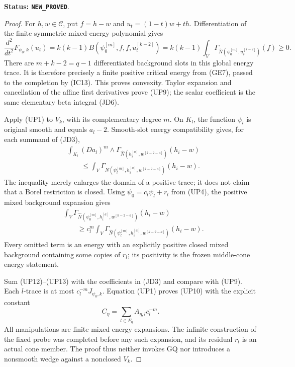 \noindent\textbf{Status: \texttt{NEW\_PROVED}}.

\begin{proof}
For $h,w\in\mathcal C$, put $f=h-w$ and $u_t=(1-t)w+th$.
Differentiation of the finite symmetric mixed-energy polynomial
gives
\[
 \frac{d^2}{dt^2}F_{\psi_0,k}(u_t)
  =k(k-1)B(\psi_0^{[m]},f,f,u_t^{[k-2]})
  =k(k-1)\int_V
        \Gamma_{\widehat N(\psi_0^{[m]},u_t^{[k-2]})}(f)\geq0.
 \tag{UP11}
\]
There are $m+k-2=q-1$ differentiated background slots in this
global energy trace.  It is therefore precisely a finite positive
critical energy from (GE7), passed to the completion by (IC13).
This proves convexity.  Taylor expansion and cancellation of
the affine first derivatives prove (UP9); the scalar coefficient
is the same elementary beta integral (JD6).

Apply (UP1) to $V_k$, with its complementary degree $m$.
On $K_l$, the function $\psi_l$ is original smooth and equals
$a_l-2$.  Smooth-slot energy compatibility gives, for each
summand of (JD3),
\[
 \begin{split}
 &\int_{K_l}(Da_l)^m\wedge
     \Gamma_{\widehat N(h_i^{[a]},w^{[k-2-a]})}(h_i-w)\\
 &\qquad\leq
     \int_V\Gamma_{\widehat N(\psi_l^{[m]},h_i^{[a]},
                                         w^{[k-2-a]})}(h_i-w).
 \end{split}
 \tag{UP12}
\]
The inequality merely enlarges the domain of a positive trace;
it does not claim that a Borel restriction is closed.
Using $\psi_0=c_l\psi_l+r_l$ from (UP4), the positive mixed
background expansion gives
\[
 \begin{split}
 &\int_V\Gamma_{\widehat N(\psi_0^{[m]},h_i^{[a]},
                                       w^{[k-2-a]})}(h_i-w)\\
 &\qquad\geq c_l^m
     \int_V\Gamma_{\widehat N(\psi_l^{[m]},h_i^{[a]},
                                         w^{[k-2-a]})}(h_i-w).
 \end{split}
 \tag{UP13}
\]
Every omitted term is an energy with an explicitly positive
closed mixed background containing some copies of $r_l$;
its positivity is the frozen middle-cone energy statement.

Sum (UP12)--(UP13) with the coefficients in (JD3) and compare
with (UP9).  Each $l$-trace is at most $c_l^{-m}J_{\psi_0,k}$.
Equation (UP1) proves (UP10) with the explicit constant
\[
                       C_\eta=
                   \sum_{l\in F_\eta}A_{\eta,l}c_l^{-m}.
 \tag{UP14}
\]
All manipulations are finite mixed-energy expansions.  The
infinite construction of the fixed probe was completed before
any such expansion, and its residual $r_l$ is an actual cone
member.  The proof thus neither invokes GQ nor introduces a
nonsmooth wedge against a nonclosed $V_k$.
\end{proof}

